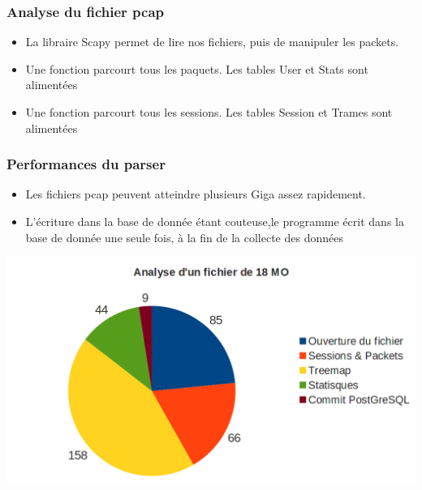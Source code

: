 \documentclass{beamer}
\begin{document}
  \begin{frame}
    \frametitle{Analyse du fichier pcap}
    \begin{itemize}
     \item La libraire Scapy permet de lire nos fichiers, puis de manipuler les packets.
     \item Une fonction parcourt tous les paquets. Les tables User et Stats sont alimentées 
     \item Une fonction parcourt tous les sessions. Les tables Session et Trames sont alimentées
    \end{itemize}
  \end{frame}
  
  \begin{frame}
    \frametitle{Performances du parser}
    \begin{itemize}
     \item Les fichiers pcap peuvent atteindre plusieurs Giga assez rapidement. 
     \item L'écriture dans la base de donnée étant couteuse,le programme écrit dans la base de donnée une seule fois, à la fin de la collecte des données
    \end{itemize}
  \end{frame}
  
  \begin{frame}
    \begin{center}
      \includegraphics[scale=0.3]{parse-time.png}
    \end{center} 
  \end{frame}
  
\end{document}
